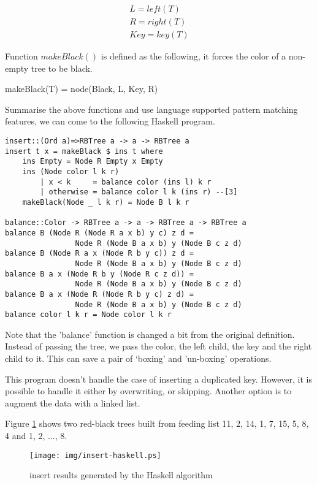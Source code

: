 \documentclass{article}
\begin{document}
\[
  \begin{array}{l}
  L = left(T) \\
  R = right(T) \\
  Key = key(T)
  \end{array}
\]


Function $makeBlack()$ is defined as the following, it forces the color
of a non-empty tree to be black.

\be
makeBlack(T) = node(Black, L, Key, R)
\ee

Summarise the above functions and use language supported pattern matching
features, we can come to the following Haskell program.

\lstset{language=Haskell}
\begin{lstlisting}
insert::(Ord a)=>RBTree a -> a -> RBTree a
insert t x = makeBlack $ ins t where
    ins Empty = Node R Empty x Empty
    ins (Node color l k r)
        | x < k     = balance color (ins l) k r
        | otherwise = balance color l k (ins r) --[3]
    makeBlack(Node _ l k r) = Node B l k r

balance::Color -> RBTree a -> a -> RBTree a -> RBTree a
balance B (Node R (Node R a x b) y c) z d = 
                Node R (Node B a x b) y (Node B c z d)
balance B (Node R a x (Node R b y c)) z d = 
                Node R (Node B a x b) y (Node B c z d)
balance B a x (Node R b y (Node R c z d)) = 
                Node R (Node B a x b) y (Node B c z d)
balance B a x (Node R (Node R b y c) z d) = 
                Node R (Node B a x b) y (Node B c z d)
balance color l k r = Node color l k r
\end{lstlisting} %

Note that the 'balance' function is changed a bit from the original
definition. Instead of passing the tree, we pass
the color, the left child, the key and the right child to it.
This can save a pair of `boxing' and 'un-boxing' operations.

This program doesn't handle the case of inserting a duplicated key.
However, it is possible to handle it either by overwriting,
or skipping. Another option is to augment the data with a linked 
list\cite{CLRS}.

Figure \ref{fig:insert-example} shows two red-black trees
built from feeding list 11, 2, 14, 1, 7, 15, 5, 8, 4 and 1, 2, ..., 8.

\begin{figure}[htbp]
  \centering
  \texttt{[image: img/insert-haskell.ps]}
  \caption{insert results generated by the Haskell algorithm} \label{fig:insert-example}
\end{figure}
\end{document}
